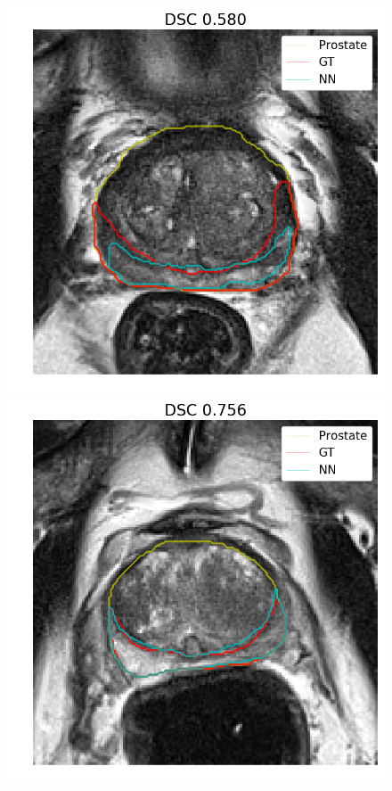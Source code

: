 \begin{figure}[h]
    \centering
    \includegraphics[totalheight=.2\textheight]{imgs/results/PZ_Px_Challenge__P_yes_ROI_MIN_Case-0300.png}
    \includegraphics[totalheight=.2\textheight]{imgs/results/PZ_Px_Challenge__P_yes_ROI_MEAN_Case-0321.png}

\end{figure}
